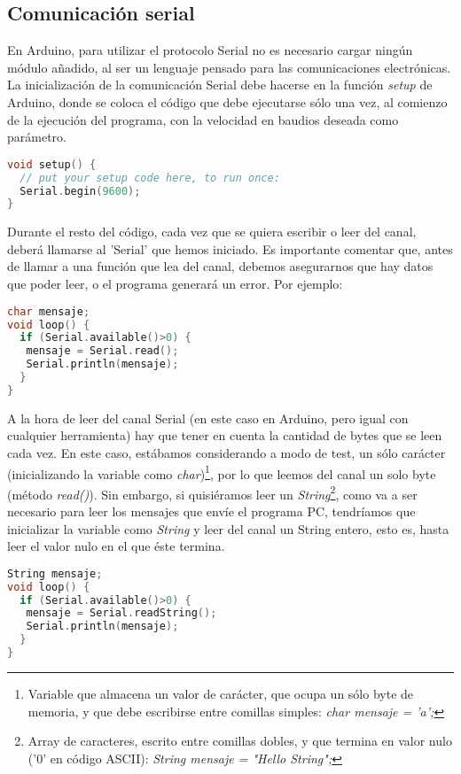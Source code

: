 \subsection{Comunicación serial}\label{subsec:SerialArduino}
En Arduino, para utilizar el protocolo Serial no es necesario cargar ningún módulo añadido, al ser un lenguaje pensado para las comunicaciones electrónicas. La inicialización de la comunicación Serial debe hacerse en la función \textit{setup} de Arduino, donde se coloca el código que debe ejecutarse sólo una vez, al comienzo de la ejecución del programa, con la velocidad en baudios deseada como parámetro.
\begin{lstlisting}[language=C,caption={Inicialización del protocolo Serial},captionpos=b]
void setup() {
  // put your setup code here, to run once:
  Serial.begin(9600);
}
\end{lstlisting}
Durante el resto del código, cada vez que se quiera escribir o leer del canal, deberá llamarse al 'Serial' que hemos iniciado. Es importante comentar que, antes de llamar a una función que lea del canal, debemos asegurarnos que hay datos que poder leer, o el programa generará un error. Por ejemplo:
\begin{lstlisting}[language=C,caption={eco en Arduino: lee del canal Serial y lo escribe},captionpos=b]
char mensaje;
void loop() {
  if (Serial.available()>0)	{
   mensaje = Serial.read();   
   Serial.println(mensaje);
  }
}
\end{lstlisting}
A la hora de leer del canal Serial (en este caso en Arduino, pero igual con cualquier herramienta) hay que tener en cuenta la cantidad de bytes que se leen cada vez. En este caso, estábamos considerando a modo de test, un sólo carácter (inicializando la variable como \textit{char})\footnote{Variable que almacena un valor de carácter, que ocupa un sólo byte de memoria, y que debe escribirse entre comillas simples:\textit{ char mensaje = 'a';}}, por lo que leemos del canal un solo byte (método \textit{read()}). Sin embargo, si quisiéramos leer un \textit{String}\footnote{Array de caracteres, escrito entre comillas dobles, y que termina en valor nulo ('0' en código ASCII): \textit{String mensaje =  "Hello String";}}, como va a ser necesario para leer los mensajes que envíe el programa PC, tendríamos que inicializar la variable como \textit{String} y leer del canal un String entero, esto es, hasta leer el valor nulo en el que éste termina.
\begin{lstlisting}[language=C,caption={eco en Arduino con un Strin},captionpos=b]
String mensaje;
void loop() {
  if (Serial.available()>0) {
   mensaje = Serial.readString();     
   Serial.println(mensaje);
  }
}
\end{lstlisting}

